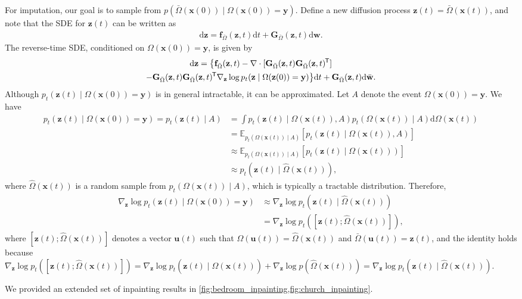 \documentclass{article} %
\newcommand*{\tran}{^{\mkern-1.5mu\mathsf{T}}}
\newcommand{\ud}{\mathrm{d}}
\newcommand{\bfx}{\mathbf{x}}
\newcommand{\bfw}{\mathbf{w}}
\newcommand{\bfz}{\mathbf{z}}
\newcommand{\bfu}{\mathbf{u}}
\newcommand{\bff}{\mathbf{f}}
\newcommand{\bfy}{\mathbf{y}}
\newcommand{\bfG}{\mathbf{G}}
\newcommand{\bomega}{{\bar{\Omega}}}
\begin{document}
For imputation, our goal is to sample from $p(\bomega(\bfx(0)) \mid \Omega(\bfx(0)) = \bfy)$. Define a new diffusion process $\bfz(t) = \bomega(\bfx(t))$, and note that the SDE for $\bfz(t)$ can be written as
\begin{align*}
\ud \bfz = \bff_\bomega(\bfz, t) \ud t + \bfG_\bomega(\bfz, t) \ud \bfw.
\end{align*}
The reverse-time SDE, conditioned on $\Omega(\bfx(0)) = \bfy$, is given by
\begin{multline*}
\ud\bfz = \big\{\bff_\bomega(\bfz, t) - \nabla \cdot [\bfG_{\bomega}(\bfz, t) \bfG_{\bomega}(\bfz,t)\tran] \\- \bfG_\bomega(\bfz, t)\bfG_\bomega(\bfz, t)\tran \nabla_\bfz \log p_t(\bfz \mid \Omega(\bfz(0)) = \bfy)\big\}\ud t + \bfG_\bomega(\bfz, t)\ud\bar{\bfw}.
\end{multline*}
Although $p_t(\bfz(t) \mid \Omega(\bfx(0)) = \bfy)$ is in general intractable, it can be approximated. Let $A$ denote the event $\Omega(\bfx(0)) = \bfy $. We have
\begin{align*}
p_t(\bfz(t) \mid \Omega(\bfx(0)) = \bfy) = p_t(\bfz(t) \mid A) &= \int p_t(\bfz(t) \mid \Omega(\bfx(t)), A) p_t(\Omega(\bfx(t)) \mid A) \ud \Omega(\bfx(t)) \\
&= \mathbb{E}_{p_t(\Omega(\bfx(t)) \mid A)}[p_t(\bfz(t) \mid \Omega(\bfx(t)), A)]\\
&\approx \mathbb{E}_{p_t(\Omega(\bfx(t)) \mid A)}[p_t(\bfz(t) \mid \Omega(\bfx(t)))]\\
&\approx p_t(\bfz(t) \mid \hat{\Omega}(\bfx(t))),
\end{align*}
where $\hat{\Omega}(\bfx(t))$ is a random sample from $p_t(\Omega(\bfx(t)) \mid A)$, which is typically a tractable distribution. Therefore,
\begin{align*}
\nabla_\bfz \log p_t(\bfz(t) \mid \Omega(\bfx(0))=\bfy) &\approx \nabla_\bfz \log p_t(\bfz(t) \mid \hat{\Omega}(\bfx(t))) \\
&= \nabla_\bfz \log p_t([\bfz(t); \hat{\Omega}(\bfx(t))]),
\end{align*}
where $[\bfz(t); \hat{\Omega}(\bfx(t))]$ denotes a vector $\bfu(t)$ such that $\Omega(\bfu(t)) = \hat{\Omega}(\bfx(t))$ and $\bar{\Omega}(\bfu(t)) = \bfz(t)$, and the identity holds because $\nabla_\bfz \log p_t([\bfz(t); \hat{\Omega}(\bfx(t))]) = \nabla_\bfz \log p_t(\bfz(t) \mid \hat{\Omega}(\bfx(t))) + \nabla_\bfz \log p(\hat{\Omega}(\bfx(t))) = \nabla_\bfz \log p_t(\bfz(t) \mid \hat{\Omega}(\bfx(t)))$.

We provided an extended set of inpainting results in \cref{fig:bedroom_inpainting,fig:church_inpainting}.
\end{document}
